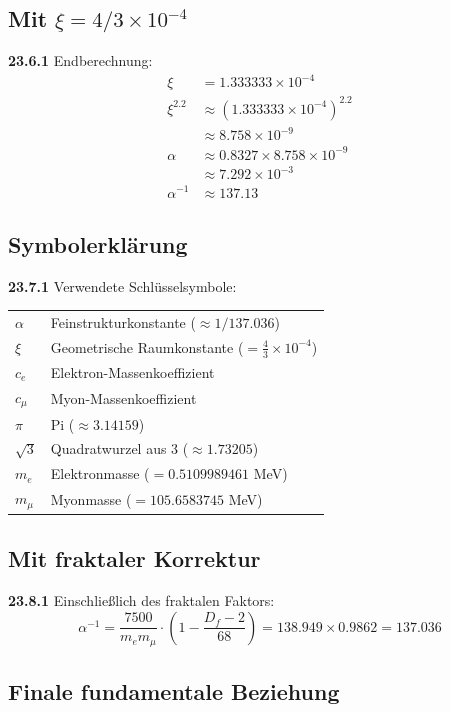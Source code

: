 \subsection{Mit $\xi = 4/3 \times 10^{-4}$}
\noindent \textbf{23.6.1} Endberechnung:
\begin{align}
	\xi &= 1.333333 \times 10^{-4} \\
	\xi^{2.2} &\approx (1.333333 \times 10^{-4})^{2.2} \\
	&\approx 8.758 \times 10^{-9} \\
	\alpha &\approx 0.8327 \times 8.758 \times 10^{-9} \\
	&\approx 7.292 \times 10^{-3} \\
	\alpha^{-1} &\approx 137.13
\end{align}

\subsection{Symbolerklärung}

\noindent \textbf{23.7.1} Verwendete Schlüsselsymbole:

\begin{tabular}{ll}
	$\alpha$ & Feinstrukturkonstante ($\approx 1/137.036$) \\
	$\xi$ & Geometrische Raumkonstante ($= \frac{4}{3} \times 10^{-4}$) \\
	$c_e$ & Elektron-Massenkoeffizient \\
	$c_\mu$ & Myon-Massenkoeffizient \\
	$\pi$ & Pi ($\approx 3.14159$) \\
	$\sqrt{3}$ & Quadratwurzel aus 3 ($\approx 1.73205$) \\
	$m_e$ & Elektronmasse ($= 0.5109989461$ MeV) \\
	$m_\mu$ & Myonmasse ($= 105.6583745$ MeV) \\
\end{tabular}

\subsection{Mit fraktaler Korrektur}

\noindent \textbf{23.8.1} Einschließlich des fraktalen Faktors:
\[
\alpha^{-1} = \frac{7500}{m_e m_\mu} \cdot \left(1 - \frac{D_f - 2}{68}\right) = 138.949 \times 0.9862 = 137.036
\]

\subsection{Finale fundamentale Beziehung}

